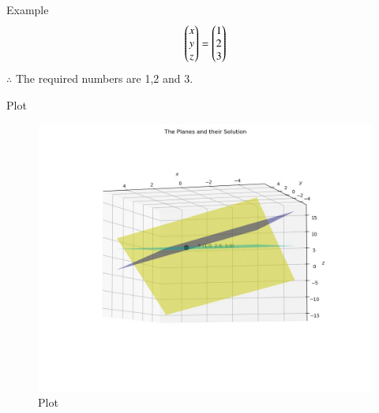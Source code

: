 \documentclass{beamer}
\begin{document}
\begin{frame}{Example}
\begin{align*}
    \begin{pmatrix}x \\ y \\ z\end{pmatrix} = \begin{pmatrix}1 \\ 2 \\ 3\end{pmatrix}
\end{align*}
$\therefore$ The required numbers are 1,2 and 3.
\end{frame}

\begin{frame}{Plot}
    \begin{figure}
        \centering
        \includegraphics[width=0.5\columnwidth]{../figs/plot_c.jpg}
        \caption{Plot}
        \label{fig:fig}
    \end{figure}
\end{frame}
\end{document}
